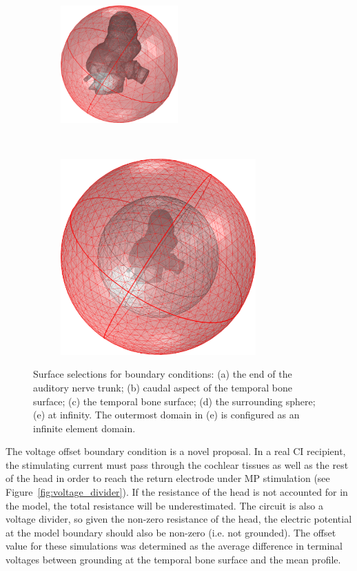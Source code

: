 \begin{figure}
\begin{subfigure}[t]{0.4\textwidth}
        \caption{}
        \label{mesh_hemi}
    \end{subfigure}%
	\begin{subfigure}[t]{0.4\textwidth}
        \centering
        \includegraphics[height=4.5cm]{Validation/mesh_sph}
        \caption{}
        \label{mesh_sph}
    \end{subfigure}\\%
	\vspace{1em}%
	\begin{subfigure}[t]{0.5\textwidth}
        \centering
        \includegraphics[height=7.5cm]{Validation/mesh_inf}
        \caption{}
        \label{mesh_inf}
    \end{subfigure}%
    
    \caption[Surface selections for boundary conditions]{Surface selections for
	boundary conditions: (a) the end of the auditory nerve trunk; (b) caudal aspect
	of the temporal bone surface; (c) the temporal bone surface; (d) the surrounding
	sphere; (e) at infinity. The outermost domain in (e) is configured as an
	infinite element domain.}
	\label{fig:boundary_surfaces}
\end{figure}

The voltage offset boundary condition is a novel proposal. In a real CI
recipient, the stimulating current must pass through the cochlear tissues as
well as the rest of the head in order to reach the return electrode under MP
stimulation (see Figure~\ref{fig:voltage_divider}). If the resistance of the
head is not accounted for in the model, the total resistance will be
underestimated. The circuit is also a voltage divider, so given the non-zero
resistance of the head, the electric potential at the model boundary should also
be non-zero (i.e. not grounded). The offset value for these simulations was
determined as the average difference in terminal voltages between grounding at
the temporal bone surface and the mean \invivo{} profile.

